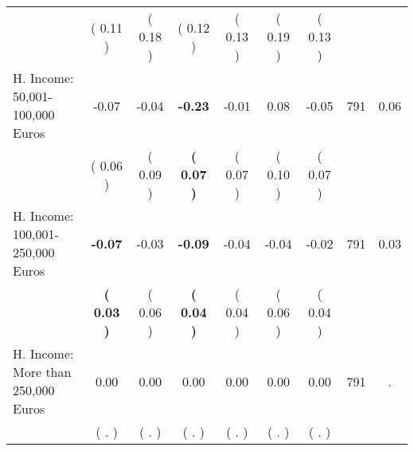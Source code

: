 \begin{tabular}{lcccccccc}
 & (     0.11 ) & (     0.18 ) & (     0.12 ) & (     0.13 ) & (     0.19 ) & (     0.13 ) & \\
H. Income: 50,001-100,000 Euros &     -0.07 &     -0.04 & \textbf{    -0.23} &     -0.01 &      0.08 &     -0.05 & 791 &       0.06 \\ 
 & (     0.06 ) & (     0.09 ) & \textbf{(     0.07 )} & (     0.07 ) & (     0.10 ) & (     0.07 ) & \\
H. Income: 100,001-250,000 Euros & \textbf{    -0.07} &     -0.03 & \textbf{    -0.09} &     -0.04 &     -0.04 &     -0.02 & 791 &       0.03 \\ 
 & \textbf{(     0.03 )} & (     0.06 ) & \textbf{(     0.04 )} & (     0.04 ) & (     0.06 ) & (     0.04 ) & \\
H. Income: More than 250,000 Euros &      0.00 &      0.00 &      0.00 &      0.00 &      0.00 &      0.00 & 791 &          . \\ 
 & (        . ) & (        . ) & (        . ) & (        . ) & (        . ) & (        . ) & \\
\bottomrule
\end{tabular}

